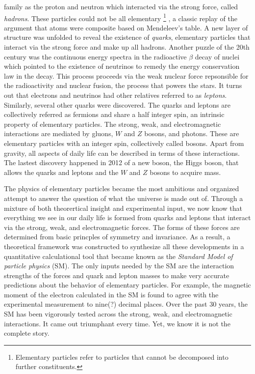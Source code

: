 family as the proton and neutron which interacted via the strong force, called \textit{hadrons}.
These particles could not be all elementary
\footnote{Elementary particles refer to  particles that cannot be decomposed into further constituents.}
, a classic replay of the argument that atoms were composite based on Mendeleev's table.
A new layer of structure was unfolded to reveal the existence of \textit{quarks}, elementary 
particles that interact via the strong force and make up all hadrons. 
Another puzzle of the 20th century was the continuous energy spectra in the radioactive $\beta$ decay of nuclei which pointed to the 
existence of neutrinos to remedy the energy conservation law in the decay. This process proceeds via the weak nuclear force 
repsonsible for the radioactivity and nuclear fusion, the process that powers the stars.
It turns out that electrons and neutrinos had other relatives referred to as \textit{leptons}.
Similarly, several other quarks were discovered.%
The quarks and leptons are collectively referred as fermions and
share a half integer spin, an intrinsic property of elementary particles.
The strong, weak, and electromagnetic interactions are mediated by 
gluons, $W$ and $Z$ bosons, and photons. These are 
elementary particles with an integer spin, 
collectively called bosons. Apart from gravity, all aspects of daily life can 
be described in terms of these interactions.
The lastest discovery happened in 2012 of a new boson, the Higgs boson, 
that allows the quarks and leptons and the $W$ and $Z$ bosons to 
acquire mass.

The physics of elementary particles became the most ambitious and organized attempt to answer the question of what the universe is 
made out of. 
Through a mixture of both theorertical insight and experimental input, we now 
know that everything we see in our daily life is formed from quarks and leptons
that interact via the strong, weak, and electromagnetic forces. 
The forms of these forces are determined from basic princples of 
symmetry and invariance.
As a result, a theoretical framework was constructed to synthesize all these 
developments in a quantitative 
calculational tool that became known as the \textit{Standard Model of particle physics} (SM). 
The only inputs needed by the SM are the interaction strengths of the forces and quark and lepton masses to make 
very accurate predictions about the behavior of elementary particles.
For example, the magnetic moment of the electron calculated in the SM is found to agree with the experimental measurement to nine(?) decimal places.
Over the past 30 years, the SM has been vigorously tested across the strong, weak, and electromagnetic interactions. 
It came out triumphant every time. Yet, we know it is not the complete story. 

